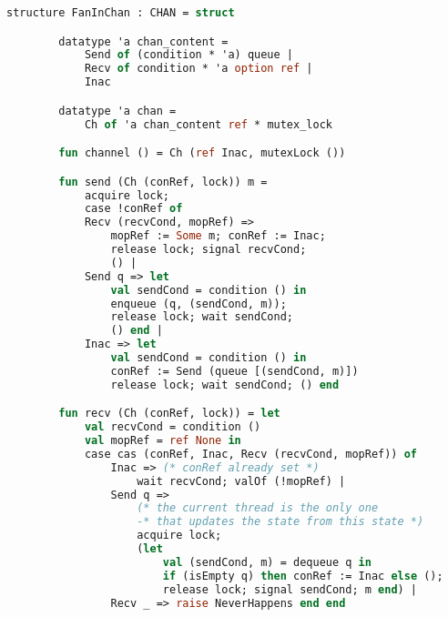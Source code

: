 \documentclass{article}
\begin{document}
    \begin{lstlisting}[language=ML, style=codestyle1]
        structure FanInChan : CHAN = struct

        datatype 'a chan_content =
            Send of (condition * 'a) queue |
            Recv of condition * 'a option ref |
            Inac

        datatype 'a chan =
            Ch of 'a chan_content ref * mutex_lock

        fun channel () = Ch (ref Inac, mutexLock ())

        fun send (Ch (conRef, lock)) m = 
            acquire lock;
            case !conRef of
            Recv (recvCond, mopRef) => 
                mopRef := Some m; conRef := Inac;
                release lock; signal recvCond;
                () |
            Send q => let
                val sendCond = condition () in
                enqueue (q, (sendCond, m));
                release lock; wait sendCond;
                () end |
            Inac => let
                val sendCond = condition () in
                conRef := Send (queue [(sendCond, m)])
                release lock; wait sendCond; () end 

        fun recv (Ch (conRef, lock)) = let
            val recvCond = condition () 
            val mopRef = ref None in
            case cas (conRef, Inac, Recv (recvCond, mopRef)) of
                Inac => (* conRef already set *)
                    wait recvCond; valOf (!mopRef) |
                Send q =>
                    (* the current thread is the only one
                    -* that updates the state from this state *)
                    acquire lock;
                    (let
                        val (sendCond, m) = dequeue q in
                        if (isEmpty q) then conRef := Inac else (); 
                        release lock; signal sendCond; m end) |
                Recv _ => raise NeverHappens end end

        \end{lstlisting}
\end{document}
